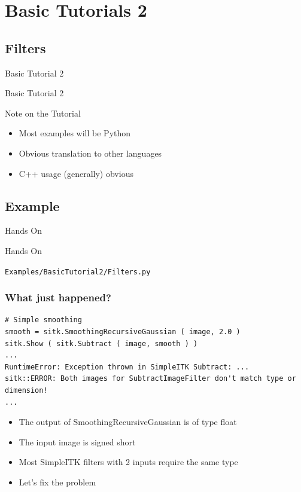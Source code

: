 \section{Basic Tutorials 2}

\subsection{Filters}

\begin{frame}{Basic Tutorial 2}
\fontsize{36pt}{36pt}\selectfont
\center
\begin{center}
Basic Tutorial 2
\end{center}
\end{frame}

\begin{frame}{Note on the Tutorial}
\begin{itemize}
  \item Most examples will be Python
  \item Obvious translation to other languages
  \item C++ usage (generally) obvious
\end{itemize}
\end{frame}

\subsection{Example}
\begin{frame}{Hands On}
\fontsize{36pt}{36pt}\selectfont
\center
\begin{center}
Hands On
\end{center}
\vspace{20pt}
\begin{center}
\fontsize{11pt}{11pt}\selectfont
\texttt{Examples/BasicTutorial2/Filters.py}
\end{center}
\end{frame}

\begin{frame}[fragile]
\frametitle{What just happened?}
\lstpython
\begin{lstlisting}
# Simple smoothing
smooth = sitk.SmoothingRecursiveGaussian ( image, 2.0 )
sitk.Show ( sitk.Subtract ( image, smooth ) )
...
RuntimeError: Exception thrown in SimpleITK Subtract: ...
sitk::ERROR: Both images for SubtractImageFilter don't match type or dimension!
...
\end{lstlisting}

\begin{itemize}
  \item The output of SmoothingRecursiveGaussian is of type float
  \item The input image is signed short
  \item Most SimpleITK filters with 2 inputs require the same type
  \item Let's fix the problem
\end{itemize}

\end{frame}

